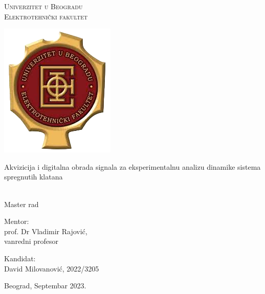 \documentclass[a4paper, 12pt, diplomski]{etf}
\begin{document}


{\selectfont

\begin{center}
    {
    \Large
    \textsc{Univerzitet u Beogradu} \\
    \textsc{Elektrotehnički fakultet} \\
	
	\vspace{22pt}    
    
    \includegraphics[scale=.5]{fig/etf_logo.png}
    
    \vfill
    
    \LARGE
    Akvizicija i digitalna obrada signala za eksperimentalnu analizu dinamike sistema spregnutih klatana
    } \\[2mm]
    {\large Master rad}
    
    \vfill
    
    \large 
    
    \begin{minipage}[t]{.49\textwidth}
    \begin{flushleft}    
    Mentor:     \\
    prof. Dr Vladimir Rajović, \\
    vanredni profesor
    \end{flushleft}
    \end{minipage}
    \begin{minipage}[t]{.49\textwidth}
    \begin{flushright}
    Kandidat: \\
    David Milovanović, 2022/3205
    \end{flushright}
    \end{minipage}

    
    \vfill
    
    Beograd, Septembar 2023.
\end{center}

\thispagestyle{empty}

}
\end{document}
